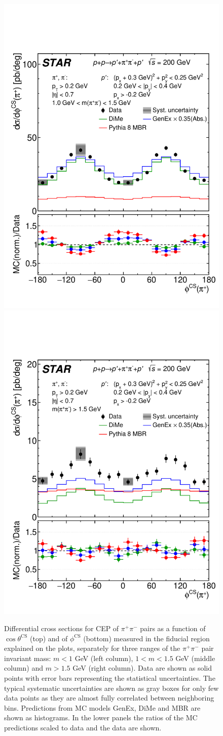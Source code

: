 \begin{figure}[h]
\hfill
\includegraphics[width=.31\textwidth,page=1]{graphics/physicsResults/Ratio_FinalResult_PhiCS_pion_MassBin_2.pdf}
\hfill
\includegraphics[width=.31\textwidth,page=1]{graphics/physicsResults/Ratio_FinalResult_PhiCS_pion_MassBin_3.pdf}
%
\caption{Differential cross sections for CEP of $\pi^+\pi^-$ pairs as a function of $\cos{\theta^\mathrm{CS}}$ (top) and of $\phi^\mathrm{CS}$ (bottom)  measured in the fiducial region explained on the plots, separately for three ranges of the $\pi^+\pi^-$ pair invariant mass: $m<1$ GeV (left column), $1<m<1.5$ GeV (middle column) and $m>1.5$ GeV (right column). Data are shown as solid points with error bars representing the statistical uncertainties. The typical systematic uncertainties are shown as gray boxes for only few data points as they are almost fully correlated between neighboring bins. Predictions from MC models GenEx, DiMe and MBR are shown as histograms. In the lower panels the ratios of the MC predictions scaled to data and the data are shown.}
\label{results_7}
\end{figure}
